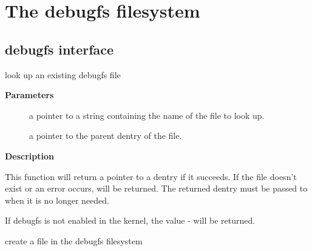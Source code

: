 \documentclass[a4paper,8pt,english]{sphinxmanual}
\begin{document}
\chapter{The debugfs filesystem}
\label{filesystems/index:the-debugfs-filesystem}

\section{debugfs interface}
\label{filesystems/index:debugfs-interface}

\begin{fulllineitems}
\label{filesystems/index:c.debugfs_lookup}
look up an existing debugfs file

\end{fulllineitems}


\textbf{Parameters}
\begin{description}
\item[{}] \leavevmode
a pointer to a string containing the name of the file to look up.

\item[{}] \leavevmode
a pointer to the parent dentry of the file.

\end{description}

\textbf{Description}

This function will return a pointer to a dentry if it succeeds.  If the file
doesn't exist or an error occurs,  will be returned.  The returned
dentry must be passed to  when it is no longer needed.

If debugfs is not enabled in the kernel, the value - will be
returned.

\begin{fulllineitems}
\label{filesystems/index:c.debugfs_create_file}
create a file in the debugfs filesystem

\end{fulllineitems}
\end{document}
